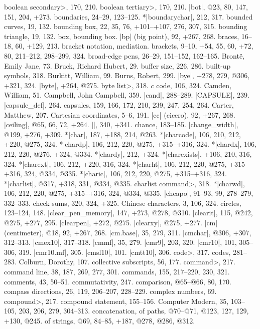 \<boolean secondary>, 170, 210.
\<boolean tertiary>, 170, 210.
|bot|, @23, 80, 147, 151, 204, +273.
boundaries, 24--29, 123--125.
*|boundarychar|, 212, 317.
bounded curves, 19, 132.
bounding box, 22, 35, 76, +101--+107, 276, 307, 315.
bounding triangle, 19, 132.
box, \see bounding box.
|bp| (big point), 92, +267, 268.
braces, 16--18, 60, +129, 213.
bracket notation, \see mediation.
brackets, 9--10, +54, 55, 60, +72, 80, 211--212, 298--299, 324.
broad-edge pens, 26--29, 151--152, 162--165.
Bront\"e, Emily Jane, 73.
Bruck, Richard Hubert, 29.
buffer size, 226, 286.
built-up symbols, 318.
Burkitt, William, 99.
Burns, Robert, 299.
|bye|, +278, 279, @306, +321, 324.
|byte|, +264, @275.
\<byte list>, 318.
\newletter
$c$ code, 106, 324.
Camden, William, 51.
Campbell, John Campbell, 359.
|cand|, 288--289.
|CAPSULE|, 239.
|capsule_def|, 264.
capsules, 159, 166, 172, 210, 239, 247, 254, 264.
Carter, Matthew, 207.
Cartesian coordinates, 5--6, 191.
|cc| (cicero), 92, +267, 268.
|ceiling|, @65, 66, 72, +264.
|\centerlargechars|, 340, +341.
chance, 183--185.
|change_width|, @199, +276, +309.
*|char|, 187, +188, 214, @263.
*|charcode|, 106, 210, 212, +220, @275, 324.
*|chardp|, 106, 212, 220, @275, +315--+316, 324.
*|chardx|, 106, 212, 220, @276, +324, @334.
*|chardy|, 212, +324.
*|charexists|, +106, 210, 316, 324.
*|charext|, 106, 212, +220, 316, 324.
*|charht|, 106, 212, 220, @275, +315--+316, 324, @334, @335.
*|charic|, 106, 212, 220, @275, +315--+316, 324.
*|charlist|, @317, +318, 331, @334, @335.
\<charlist command>, 318.
*|charwd|, 106, 212, 220, @275, +315--+316, 324, @334, @335.
|cheapo|, 91--93, 99, 278--279, 332--333.
check sums, 320, 324, +325.
Chinese characters, 3, 106, 324.
circles, 123--124, 148.
|clear_pen_memory|, 147, +273, @278, @310.
|clearit|, 115, @242, @275, +277, 295.
|clearpen|, +272, @275.
|clearxy|, @275, +277.
|cm| (centimeter), @18, 92, +267, 268.
|cm.base|, 35, 279, 311.
|cmchar|, @306, +307, 312--313.
|cmex10|, 317--318.
|cmmf|, 35, 279.
|cmr9|, 203, 320.
|cmr10|, 101, 305--306, 319.
|cmr10.mf|, 305.
|cmsl10|, 101.
|cmtt10|, 306.
\<code>, 317.
codes, 281--283.
Colburn, Dorothy, 107.
collective subscripts, 56, 177.
\<command>, 217.
command line, 38, 187, 269, 277, 301.
commands, 155, 217--220, 230, 321.
comments, 43, 50--51.
commutativity, 247.
comparison, @65--@66, 80, 170.
compass directions, 26, 119, 206--207, 228--229.
complex numbers, 69.
\<compound>, 217.
compound statement, 155--156.
Computer Modern, 35, 103--105, 203, 206, 279, 304--313.
concatenation, of paths, @70--@71, @123, 127, 129, +130, @245.
\sub of strings, @69, 84--85, +187, @278, @286, @312.
